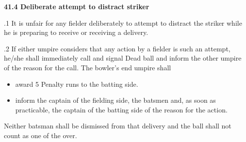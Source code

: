 \documentclass[12pt]{article}
\begin{document}
\vspace{\baselineskip}
{\fontsize{11pt}{13.2pt}\selectfont \textbf{41.4 \tabto{0.47in} Deliberate attempt to distract striker}\par}\par


\vspace{\baselineskip}
\begin{adjustwidth}{0.5in}{0.33in}
{\fontsize{9pt}{10.8pt}.1 \tabto{0.49in} It is unfair for any fielder deliberately to attempt to distract the striker while he is preparing to receive or receiving a delivery.\par}\par

\end{adjustwidth}


\vspace{\baselineskip}
\begin{adjustwidth}{0.5in}{0.15in}
{\fontsize{9pt}{10.8pt}.2 \tabto{0.49in} If either umpire considers that any action by a fielder is such an attempt, he/she shall immediately call and signal Dead ball and inform the other umpire of the reason for the call. The bowler’s end umpire shall\par}\par

\end{adjustwidth}


\vspace{\baselineskip}
\begin{itemize}
	\item {\fontsize{9pt}{10.8pt}\selectfont award 5 Penalty runs to the batting side.\par}\par


\vspace{\baselineskip}
	\item {\fontsize{9pt}{10.8pt}\selectfont inform the captain of the fielding side, the batsmen and, as soon as practicable, the captain of the batting side of the reason for the action.\par}
\end{itemize}\par


\vspace{\baselineskip}
\begin{adjustwidth}{0.5in}{0.0in}
{\fontsize{9pt}{10.8pt}\selectfont Neither batsman shall be dismissed from that delivery and the ball shall not count as one of the over.\par}\par

\end{adjustwidth}
\end{document}
